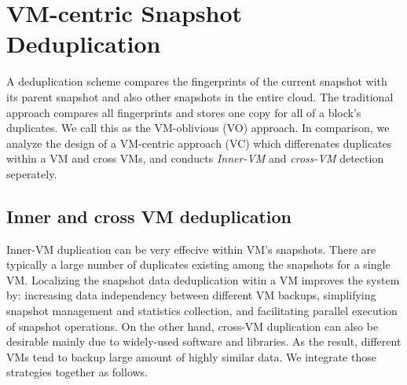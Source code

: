 \section{VM-centric Snapshot Deduplication}
\label{sect:dedupe}


A deduplication scheme compares the fingerprints of the current snapshot
with its parent snapshot and also other snapshots in the entire cloud.
The traditional approach compares all fingerprints and 
stores one copy for all of a block's duplicates.
We call this as  the VM-oblivious (VO) approach.
In comparison, we analyze the design of
a VM-centric approach (VC) which differenates duplicates within a VM and cross VMs,
and conducts \textit{Inner-VM} and \textit{cross-VM} detection seperately. 

\subsection{Inner and cross VM deduplication}

Inner-VM duplication can be very effecive within VM's snapshots. There
are typically a large number of duplicates existing among the snapshots
for a single VM.  Localizing the snapshot data deduplication witin a VM
improves the system by:
increasing data independency between different VM backups,
simplifying snapshot management and statistics collection,
and facilitating parallel execution of snapshot operations.
On the other hand, cross-VM duplication can also be desirable mainly due to widely-used software and libraries. 
As the result, different VMs tend to backup large amount of highly similar data.
We integrate those strategies together as follows.

